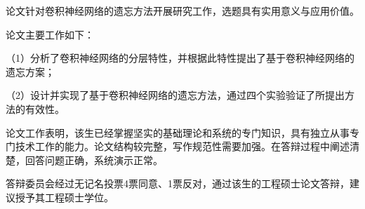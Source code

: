 
\begin{resolution}

论文针对卷积神经网络的遗忘方法开展研究工作，选题具有实用意义与应用价值。

论文主要工作如下： 

（1）分析了卷积神经网络的分层特性，并根据此特性提出了基于卷积神经网络的遗忘方案； 

（2）设计并实现了基于卷积神经网络的遗忘方法，通过四个实验验证了所提出方法的有效性。 

论文工作表明，该生已经掌握坚实的基础理论和系统的专门知识，具有独立从事专门技术工作的能力。论文结构较完整，写作规范性需要加强。在答辩过程中阐述清楚，回答问题正确，系统演示正常。

答辩委员会经过无记名投票4票同意、1票反对，通过该生的工程硕士论文答辩，建议授予其工程硕士学位。
    

\end{resolution}
